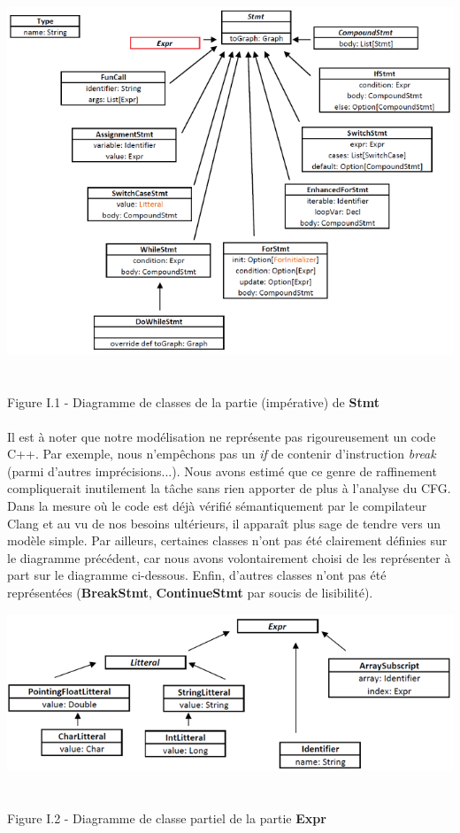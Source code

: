 \documentclass{report}
\begin{document}
\begin{center}
\includegraphics[scale=0.9]{data/stmt.png}
~\\~\\Figure I.1 - Diagramme de classes de la partie (imp\'{e}rative) de \textbf{Stmt}
\end{center}

\paragraph{}
\hspace{4mm}\textnormal{Il est \`{a} noter que notre mod\'{e}lisation ne repr\'{e}sente pas rigoureusement un code C++.  Par exemple, nous n'emp\^{e}chons pas un \textit{if} de contenir d'instruction \textit{break} (parmi d'autres impr\'{e}cisions...).
Nous avons estim\'{e} que ce genre de raffinement compliquerait inutilement la t\^{a}che
sans rien apporter de plus \`{a} l'analyse du CFG. Dans la mesure o\`{u} le code est d\'{e}j\`{a} v\'{e}rifi\'{e} s\'{e}mantiquement par le compilateur Clang et au vu de nos besoins ult\'{e}rieurs,
il appara\^{i}t plus sage de tendre vers un mod\`{e}le simple. Par ailleurs, certaines classes n'ont pas \'{e}t\'{e} clairement d\'{e}finies sur le diagramme pr\'{e}c\'{e}dent, car nous avons volontairement
choisi de les repr\'{e}senter \`{a} part sur le diagramme ci-dessous. Enfin, d'autres classes n'ont pas \'{e}t\'{e} repr\'{e}sent\'{e}es (\textbf{BreakStmt}, \textbf{ContinueStmt} par soucis de lisibilit\'{e}).}

\begin{center}
\includegraphics[scale=0.9]{data/expr1.png}
~\\~\\Figure I.2 - Diagramme de classe partiel de la partie \textbf{Expr}
\end{center}
\end{document}
